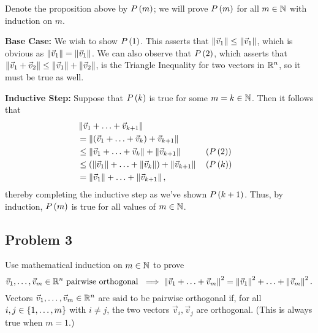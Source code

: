 \documentclass[main.tex]{subfiles}
\begin{document}
\begin{soln}
    Denote the proposition above by $P\left( m \right)$; we will prove $P\left( m \right)$ for all $m\in \mathbb N$ with induction on $m$.

    \textbf{Base Case:} We wish to show $P\left( 1 \right)$. This asserts that $\left\lVert \vec{v}_{1} \right\rVert \le \left\lVert \vec{v}_{1} \right\rVert$, which is obvious as $\left\lVert \vec{v}_{1} \right\rVert = \left\lVert \vec{v}_{1} \right\rVert$. We can also observe that $P\left( 2 \right)$, which asserts that $\left\lVert \vec{v}_{1} + \vec{v}_{2} \right\rVert \le \left\lVert \vec{v}_{1} \right\rVert + \left\lVert \vec{v}_{2} \right\rVert$, is the Triangle Inequality for two vectors in $\mathbb R^n$, so it must be true as well.

    \textbf{Inductive Step:} Suppose that $P\left( k \right)$ is true for some $m = k\in \mathbb N$. Then it follows that
    \begin{align*}
        &\left\lVert \vec{v}_{1} + \ldots + \vec{v}_{k + 1} \right\rVert \\
        &=\left\lVert \left( \vec{v}_{1} + \ldots + \vec{v}_{k} \right) + \vec{v}_{k + 1} \right\rVert \\
        &\le \left\lVert \vec{v}_{1} + \ldots + \vec{v}_{k} \right\rVert + \left\lVert \vec{v}_{k + 1} \right\rVert && \left( P\left( 2 \right) \right) \\
        &\le \left( \left\lVert \vec{v}_{1} \right\rVert + \ldots + \left\lVert \vec{v}_{k} \right\rVert \right) + \left\lVert \vec{v}_{k + 1} \right\rVert && \left( P\left( k \right) \right) \\
        &= \left\lVert \vec{v}_{1} \right\rVert + \ldots + \left\lVert \vec{v}_{k + 1} \right\rVert,
    \end{align*}
    thereby completing the inductive step as we've shown $P\left( k + 1 \right)$. Thus, by induction, $P\left( m \right)$ is true for all values of $m\in \mathbb N$.
\end{soln}
\eject

\subsection{Problem 3}
\begin{claim}
    Use mathematical induction on $m \in\mathbb N$ to prove
\[\vec{v}_1, \ldots ,\vec{v}_m \in\mathbb R^n\text{ pairwise orthogonal }\implies \left\lVert \vec{v}_1 + \ldots + \vec{v}_m \right\rVert^2 = \left\lVert \vec{v}_1 \right\rVert^2 + \ldots + \left\lVert \vec{v}_m \right\rVert^2.\]
Vectors $\vec{v}_1, \ldots , \vec{v}_m \in\mathbb R^n$ are said to be pairwise orthogonal if, for all $i,j \in\left\{ 1,\ldots ,m \right\}$ with $i \neq j$, the two vectors $\vec{v}_i,\vec{v}_j$ are orthogonal. (This is always true when $m = 1$.)
\end{claim}
\end{document}
